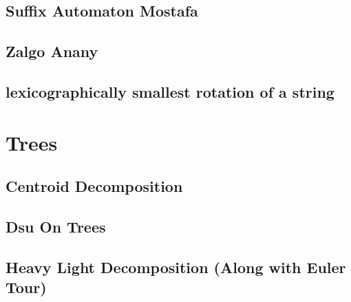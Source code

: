 \subsection{Suffix Automaton Mostafa}
\vspace{-2.3ex}
\raggedbottom
\vspace{-3.3ex}
\hrulefill
\vspace{-1ex}
\subsection{Zalgo Anany}
\vspace{-2.3ex}
\raggedbottom
\vspace{-3.3ex}
\hrulefill
\vspace{-1ex}
\subsection{lexicographically smallest rotation of a string}
\vspace{-2.3ex}
\raggedbottom
\vspace{-3.3ex}
\hrulefill

\section{Trees}
\vspace{-1ex}
\subsection{Centroid Decomposition}
\vspace{-2.3ex}
\raggedbottom
\vspace{-3.3ex}
\hrulefill
\vspace{-1ex}
\subsection{Dsu On Trees}
\vspace{-2.3ex}
\raggedbottom
\vspace{-3.3ex}
\hrulefill
\vspace{-1ex}
\subsection{Heavy Light Decomposition (Along with Euler Tour)}
\vspace{-2.3ex}
\raggedbottom
\vspace{-3.3ex}
\hrulefill
\vspace{-1ex}
